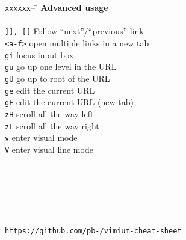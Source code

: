 \documentclass{article}
\newcommand{\widetabhead}{\texttt{xxxxxx}-- \= \kill}
\begin{document}
\begin{multicols*}{4}
    \columnbreak
    
    \begin{tabbing}
      \widetabhead
      \textbf{Advanced usage} \\
      \\
      \texttt{]], [[} \> Follow \enquote{next}/\enquote{previous} link \\
      \texttt{<a-f>}  \> open multiple links in a new tab \\
      \texttt{gi}     \> focus input box \\
      \texttt{gu}     \> go up one level in the URL \\
      \texttt{gU}     \> go up to root of the URL \\
      \texttt{ge}     \> edit the current URL \\
      \texttt{gE}     \> edit the current URL (new tab) \\
      \texttt{zH}     \> scroll all the way left \\
      \texttt{zL}     \> scroll all the way right \\
      \texttt{v}      \> enter visual mode \\
      \texttt{V}      \> enter visual line mode \\
      \\
      \\
      \\
      \\
      \\
      \\
      \footnotesize{\texttt{https://github.com/pb-/vimium-cheat-sheet}}
    \end{tabbing}
  \end{multicols*}
\end{document}
